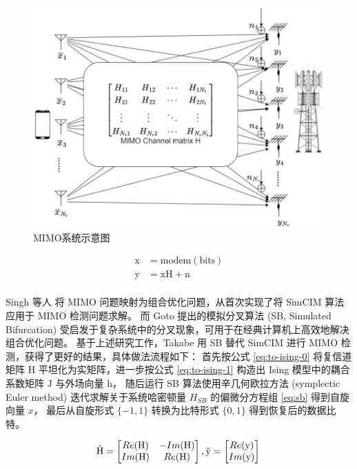 \documentclass[withoutpreface,bwprint]{cumcmthesis}
\begin{document}
\begin{figure}[h!]
	\centering
	\includegraphics[scale=0.37]{figures/mimo.png}
	\caption{MIMO系统示意图}
	\label{fig:mimo}
\end{figure}

\begin{equation}
\begin{split}
\mathrm{x} &= \mathrm{modem}(\mathrm{bits}) \\
\mathrm{y} &= \mathrm{x} \mathrm{H} + \mathrm{n} \\
\end{split}
\label{eq:mimo}
\end{equation}

Singh 等人 \cite{Singh2021} 将 MIMO 问题映射为组合优化问题，从首次实现了将 SimCIM 算法应用于 MIMO 检测问题求解。
而 Goto 提出的模拟分叉算法 (SB, Simulated Bifurcation) \cite{Goto2021} 受启发于复杂系统中的分叉现象，可用于在经典计算机上高效地解决组合优化问题。
基于上述研究工作，Takabe \cite{Takabe2023} 用 SB 替代 SimCIM 进行 MIMO 检测，获得了更好的结果，具体做法流程如下：
首先按公式 \ref{eq:to-ising-0} 将复信道矩阵 $ \mathrm{H} $ 平坦化为实矩阵，进一步按公式 \ref{eq:to-ising-1} 构造出 Ising 模型中的耦合系数矩阵 $ \mathrm{J} $ 与外场向量 $ \mathrm{h} $，
随后运行 SB 算法使用辛几何欧拉方法 (symplectic Euler method) 迭代求解关于系统哈密顿量 $ H_{SB} $ 的偏微分方程组 \ref{eq:sb} 得到自旋向量 $ x $，
最后从自旋形式 $ \{-1,1\} $ 转换为比特形式 $ \{0,1\} $ 得到恢复后的数据比特。

\begin{equation}
\tilde{\mathrm H} = \begin{bmatrix}
   Re(\mathrm H) & -Im(\mathrm H) \\
   Im(\mathrm H) &  Re(\mathrm H) \\ 
\end{bmatrix},
\tilde{\mathrm y} = \begin{bmatrix}
   Re(\mathrm y)  \\
   Im(\mathrm y) \\ 
\end{bmatrix} \\
\label{eq:to-ising-0}
\end{equation}
\end{document}
